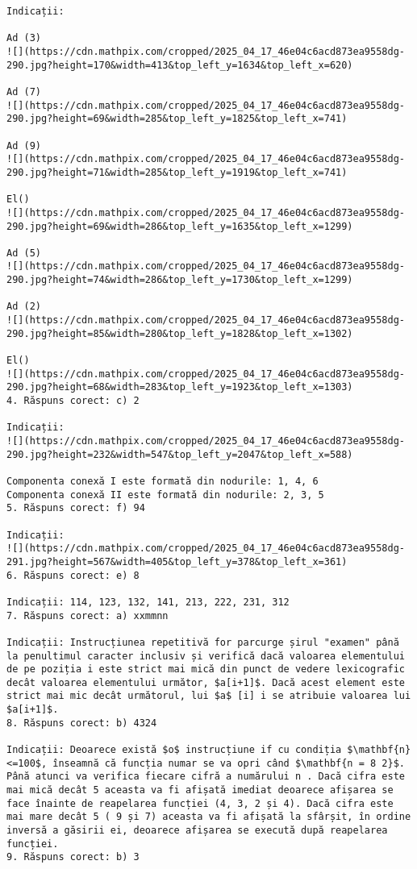 \begin{verbatim}
Indicații:

Ad (3)
![](https://cdn.mathpix.com/cropped/2025_04_17_46e04c6acd873ea9558dg-290.jpg?height=170&width=413&top_left_y=1634&top_left_x=620)

Ad (7)
![](https://cdn.mathpix.com/cropped/2025_04_17_46e04c6acd873ea9558dg-290.jpg?height=69&width=285&top_left_y=1825&top_left_x=741)

Ad (9)
![](https://cdn.mathpix.com/cropped/2025_04_17_46e04c6acd873ea9558dg-290.jpg?height=71&width=285&top_left_y=1919&top_left_x=741)

El()
![](https://cdn.mathpix.com/cropped/2025_04_17_46e04c6acd873ea9558dg-290.jpg?height=69&width=286&top_left_y=1635&top_left_x=1299)

Ad (5)
![](https://cdn.mathpix.com/cropped/2025_04_17_46e04c6acd873ea9558dg-290.jpg?height=74&width=286&top_left_y=1730&top_left_x=1299)

Ad (2)
![](https://cdn.mathpix.com/cropped/2025_04_17_46e04c6acd873ea9558dg-290.jpg?height=85&width=280&top_left_y=1828&top_left_x=1302)

El()
![](https://cdn.mathpix.com/cropped/2025_04_17_46e04c6acd873ea9558dg-290.jpg?height=68&width=283&top_left_y=1923&top_left_x=1303)
4. Răspuns corect: c) 2

Indicații:
![](https://cdn.mathpix.com/cropped/2025_04_17_46e04c6acd873ea9558dg-290.jpg?height=232&width=547&top_left_y=2047&top_left_x=588)

Componenta conexă I este formată din nodurile: 1, 4, 6
Componenta conexă II este formată din nodurile: 2, 3, 5
5. Răspuns corect: f) 94

Indicații:
![](https://cdn.mathpix.com/cropped/2025_04_17_46e04c6acd873ea9558dg-291.jpg?height=567&width=405&top_left_y=378&top_left_x=361)
6. Răspuns corect: e) 8

Indicații: 114, 123, 132, 141, 213, 222, 231, 312
7. Răspuns corect: a) xxmmnn

Indicații: Instrucțiunea repetitivă for parcurge șirul "examen" până la penultimul caracter inclusiv și verifică dacă valoarea elementului de pe poziția i este strict mai mică din punct de vedere lexicografic decât valoarea elementului următor, $a[i+1]$. Dacă acest element este strict mai mic decât următorul, lui $a$ [i] i se atribuie valoarea lui $a[i+1]$.
8. Răspuns corect: b) 4324

Indicații: Deoarece există $o$ instrucțiune if cu condiția $\mathbf{n}<=100$, înseamnă că funcția numar se va opri când $\mathbf{n = 8 2}$. Până atunci va verifica fiecare cifră a numărului n . Dacă cifra este mai mică decât 5 aceasta va fi afișată imediat deoarece afișarea se face înainte de reapelarea funcției (4, 3, 2 și 4). Dacă cifra este mai mare decât 5 ( 9 și 7) aceasta va fi afișată la sfârșit, în ordine inversă a găsirii ei, deoarece afișarea se execută după reapelarea funcției.
9. Răspuns corect: b) 3


\end{verbatim}
